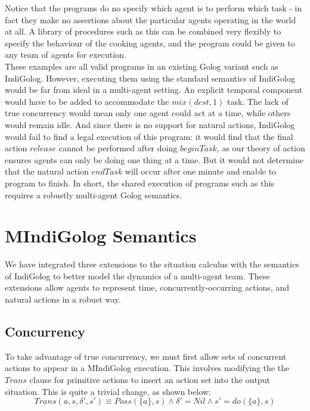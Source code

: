 Notice that the programs do no specify which agent is to perform which
task - in fact they make no assertions about the particular agents
operating in the world at all. A library of procedures such as this
can be combined very flexibly to specify the behaviour of the cooking
agents, and the program could be given to any team of agents for execution.\\


These examples are all valid programs in an existing Golog variant
such as IndiGolog. However, executing them using the standard semantics
of IndiGolog would be far from ideal in a multi-agent setting. An
explicit temporal component would have to be added to accommodate
the $mix(dest,1)$ task. The lack of true concurrency would mean only
one agent could act at a time, while others would remain idle. And
since there is no support for natural actions, IndiGolog would fail
to find a legal execution of this program: it would find that the
final action $release$ cannot be performed after doing $beginTask$,
as our theory of action ensures agents can only be doing one thing
at a time. But it would not determine that the natural action $endTask$
will occur after one minute and enable to program to finish. In short,
the shared execution of programs such as this requires a robustly
multi-agent Golog semantics.


\section{MIndiGolog Semantics\label{sec:MIndiGolog:Semantics}}

We have integrated three extensions to the situation calculus with
the semantics of IndiGolog to better model the dynamics of a multi-agent
team. These extensions allow agents to represent time, concurrently-occurring
actions, and natural actions in a robust way.


\subsection{Concurrency}

To take advantage of true concurrency, we must first allow sets of
concurrent actions to appear in a MIndiGolog execution. This involves
modifying the the $Trans$ clause for primitive actions to insert
an action set into the output situation. This is quite a trivial change,
as shown below:\[
Trans(a,s,\delta',s')\equiv Poss(\{a\},s)\wedge\delta'=Nil\wedge s'=do(\{a\},s)\]


